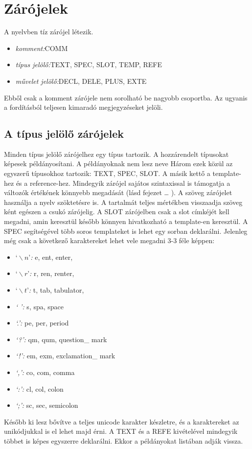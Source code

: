 \section{Zárójelek}
A nyelvben tíz zárójel létezik.
\begin{itemize}
\item \emph{komment:}COMM
\item \emph{típus jelölő:}TEXT, SPEC, SLOT, TEMP, REFE
\item \emph{művelet jelölő:}DECL, DELE, PLUS, EXTE
\end{itemize}
Ebből csak a komment zárójele nem sorolható be nagyobb csoportba.
Az ugyanis a fordításból teljesen kimaradó megjegyzéseket jelöli.


\subsection{A típus jelölő zárójelek}
Minden típus jelölő zárójelhez egy típus tartozik.
A hozzárendelt típusokat képesek példányosítani.
A példányoknak nem lesz neve
Három ezek közül az egyszerű típusokhoz tartozik: TEXT, SPEC, SLOT. 
A másik kettő a template-hez és a reference-hez. 
Mindegyik zárójel sajátos szintaxissal is támogatja a változók értékének könnyebb megadását (lásd fejezet … ). 
A szöveg zárójelet használja a nyelv szöktetésre is. 
A tartalmát teljes mértékben visszaadja szöveg ként egészen a csukó zárójelig.
A SLOT zárójelben csak a slot címkéjét kell megadni, amin keresztül később könnyen hivatkozható a template-en keresztül. 
A SPEC segítségével több soros templateket is lehet egy sorban deklarálni. 
Jelenleg még csak a következő karaktereket lehet vele megadni 3-3 féle képpen: 
\begin{itemize}
\item \emph{$‘\backslash n’$:} e, ent, enter, 
\item \emph{$‘\backslash r’$:} r, ren, renter, 
\item \emph{$‘\backslash t’$:} t, tab, tabulator, 
\item \emph{‘ ’:} s, spa, space 
\item \emph{‘.’:} pe, per, period 
\item \emph{‘?’:} qm, qum, question\_ mark 
\item \emph{‘!’:} em, exm, exclamation\_ mark 
\item \emph{‘,’:} co, com, comma
\item \emph{‘:’:} cl, col, colon 
\item \emph{‘;’:} sc, sec, semicolon
\end{itemize}
Később ki lesz bővítve a teljes unicode karakter készletre, és a karaktereket az unikódjukkal is el lehet majd érni. 
A TEXT és a REFE kivételével mindegyik többet is képes egyszerre deklarálni.
Ekkor a példányokat listában adják vissza.


